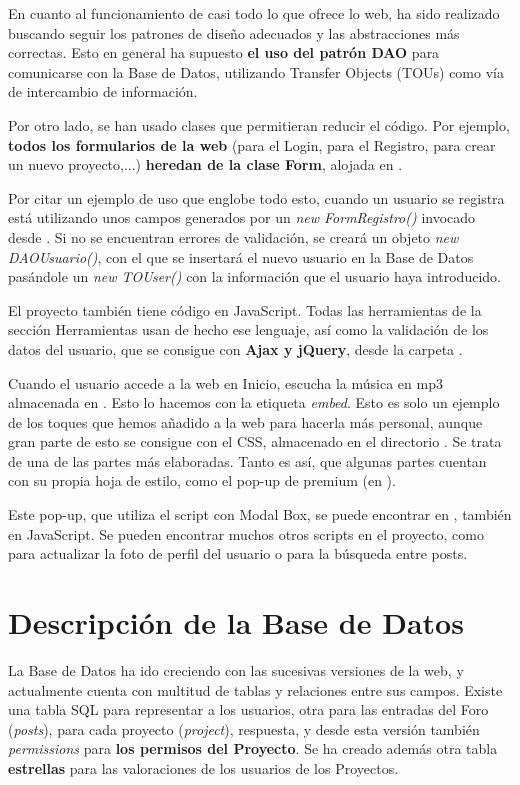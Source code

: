 \documentclass[12pt]{report}
\begin{document}
En cuanto al funcionamiento de casi todo lo que ofrece lo web, ha sido realizado buscando seguir los patrones de diseño adecuados y las abstracciones más correctas. Esto en general ha supuesto \textbf{el uso del patrón DAO} para comunicarse con la Base de Datos, utilizando Transfer Objects (TOUs) como vía de intercambio de información.

Por otro lado, se han usado clases que permitieran reducir el código. Por ejemplo, \textbf{todos los formularios de la web} (para el Login, para el Registro, para crear un nuevo proyecto,...) \textbf{heredan de la clase Form}, alojada en .

Por citar un ejemplo de uso que englobe todo esto, cuando un usuario se registra está utilizando unos campos generados por un \textit{new FormRegistro()} invocado desde . Si no se encuentran errores de validación, se creará un objeto \textit{new DAOUsuario()}, con el que se insertará el nuevo usuario en la Base de Datos pasándole un \textit{new TOUser()} con la información que el usuario haya introducido.

El proyecto también tiene código en JavaScript. Todas las herramientas de la sección Herramientas usan de hecho ese lenguaje, así como la validación de los datos del usuario, que se consigue con \textbf{Ajax y jQuery}, desde la carpeta .

Cuando el usuario accede a la web en Inicio, escucha la música en mp3 almacenada en . Esto lo hacemos con la etiqueta \textit{embed}. Esto es solo un ejemplo de los toques que hemos añadido a la web para hacerla más personal, aunque gran parte de esto se consigue con el CSS, almacenado en el directorio . Se trata de una de las partes más elaboradas. Tanto es así, que algunas partes cuentan con su propia hoja de estilo, como el pop-up de premium (en ).

Este pop-up, que utiliza el script con Modal Box, se puede encontrar en , también en JavaScript. Se pueden encontrar muchos otros scripts en el proyecto, como  para actualizar la foto de perfil del usuario o  para la búsqueda entre posts.

\section{Descripción de la Base de Datos}

La Base de Datos ha ido creciendo con las sucesivas versiones de la web, y actualmente cuenta con multitud de tablas y relaciones entre sus campos. Existe una tabla SQL para representar a los usuarios, otra para las entradas del Foro (\textit{posts}), para cada proyecto (\textit{project}),  respuesta, y desde esta versión también \textit{permissions} para \textbf{los permisos del Proyecto}. Se ha creado además otra tabla \textbf{estrellas} para las valoraciones de los usuarios de los Proyectos.
\end{document}

